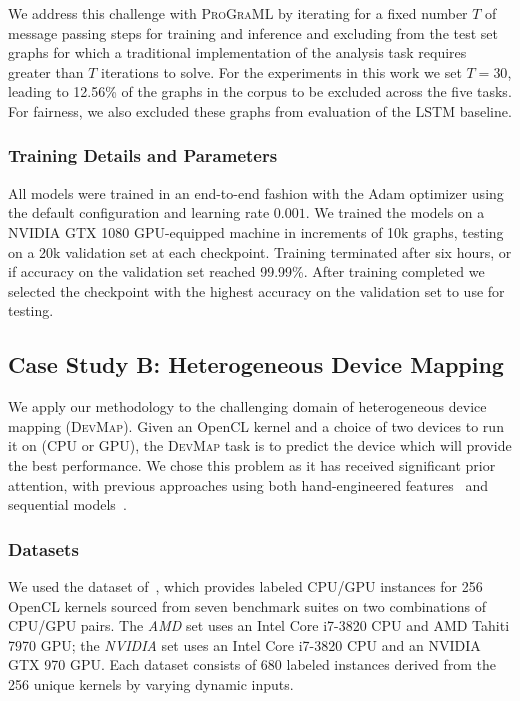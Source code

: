We address this challenge with \textsc{ProGraML} by iterating for a
fixed number $T$ of message passing steps for training and inference
and excluding from the test set graphs for which a traditional
implementation of the analysis task requires greater than $T$
iterations to solve. For the experiments in this work we set $T = 30$,
leading to 12.56\% of the graphs in the corpus to be excluded across
the five tasks. For fairness, we also excluded these graphs from
evaluation of the LSTM baseline.


\subsubsection{Training Details and Parameters}
All models were trained in an end-to-end fashion with the Adam
optimizer \cite{Kingma2015} using the default configuration and
learning rate $0.001$. We trained the models on a NVIDIA GTX 1080
GPU-equipped machine in increments of 10k graphs, testing on a 20k
validation set at each checkpoint. Training terminated after six
hours, or if accuracy on the validation set reached 99.99\%. After
training completed we selected the checkpoint with the highest
accuracy on the validation set to use for testing.


\subsection{Case Study B: Heterogeneous Device Mapping}

We apply our methodology to the challenging domain of heterogeneous
device mapping (\textsc{DevMap}). Given an OpenCL kernel and a choice
of two devices to run it on (CPU or GPU), the \textsc{DevMap} task is
to predict the device which will provide the best performance. We
chose this problem as it has received significant prior attention,
with previous approaches using both hand-engineered
features~\cite{Grewe2013} and sequential models~\cite{Cummins2017b,
  Ben-nun2018}.

\subsubsection{Datasets}

We used the dataset of~\cite{Cummins2017b}, which provides labeled
CPU/GPU instances for 256 OpenCL kernels sourced from seven benchmark
suites on two combinations of CPU/GPU pairs. The \emph{AMD} set uses
an Intel Core i7-3820 CPU and AMD Tahiti 7970 GPU; the \emph{NVIDIA}
set uses an Intel Core i7-3820 CPU and an NVIDIA GTX 970 GPU. Each
dataset consists of 680 labeled instances derived from the 256 unique
kernels by varying dynamic inputs.

